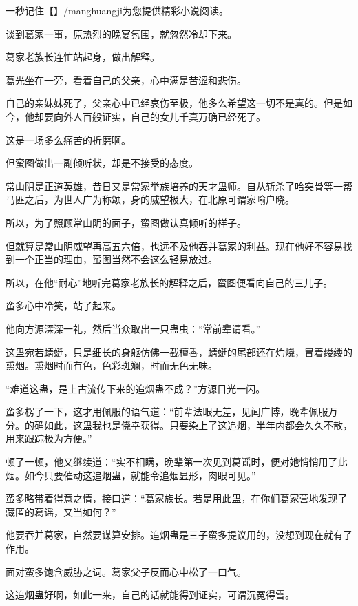 
\begin{this_body}

一秒记住【】/manghuangji为您提供精彩小说阅读。

谈到葛家一事，原热烈的晚宴氛围，就忽然冷却下来。

葛家老族长连忙站起身，做出解释。

葛光坐在一旁，看着自己的父亲，心中满是苦涩和悲伤。

自己的亲妹妹死了，父亲心中已经哀伤至极，他多么希望这一切不是真的。但是如今，他却要向外人百般证实，自己的女儿千真万确已经死了。

这是一场多么痛苦的折磨啊。

但蛮图做出一副倾听状，却是不接受的态度。

常山阴是正道英雄，昔日又是常家举族培养的天才蛊师。自从斩杀了哈突骨等一帮马匪之后，为世人广为称颂，身的威望极大，在北原可谓家喻户晓。

所以，为了照顾常山阴的面子，蛮图做认真倾听的样子。

但就算是常山阴威望再高五六倍，也远不及他吞并葛家的利益。现在他好不容易找到一个正当的理由，蛮图当然不会这么轻易放过。

所以，在他“耐心”地听完葛家老族长的解释之后，蛮图便看向自己的三儿子。

蛮多心中冷笑，站了起来。

他向方源深深一礼，然后当众取出一只蛊虫：“常前辈请看。”

这蛊宛若蜻蜓，只是细长的身躯仿佛一截檀香，蜻蜓的尾部还在灼烧，冒着缕缕的熏烟。熏烟时而有色，色彩斑斓，时而无色无味。

“难道这蛊，是上古流传下来的追烟蛊不成？”方源目光一闪。

蛮多楞了一下，这才用佩服的语气道：“前辈法眼无差，见闻广博，晚辈佩服万分。的确如此，这蛊我也是侥幸获得。只要染上了这追烟，半年内都会久久不散，用来跟踪极为方便。”

顿了一顿，他又继续道：“实不相瞒，晚辈第一次见到葛谣时，便对她悄悄用了此烟。如今只要催动这追烟蛊，就能令追烟显形，肉眼可见。”

蛮多略带着得意之情，接口道：“葛家族长。若是用此蛊，在你们葛家营地发现了藏匿的葛谣，又当如何？”

他要吞并葛家，自然要谋算安排。追烟蛊是三子蛮多提议用的，没想到现在就有了作用。

面对蛮多饱含威胁之词。葛家父子反而心中松了一口气。

这追烟蛊好啊，如此一来，自己的话就能得到证实，可谓沉冤得雪。


\end{this_body}
